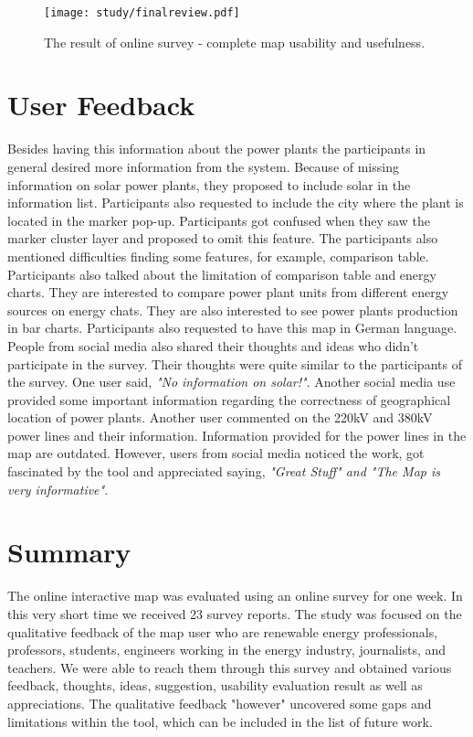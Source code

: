 \begin{figure} 
  \begin{center}
    \texttt{[image: study/finalreview.pdf]}
    \caption{The result of online survey - complete map usability and usefulness.}
    \label{fig:finalRev}
  \end{center}
\end{figure}

\section{User Feedback}

Besides having this information about the power plants the participants in general desired more information from the system. Because of missing information on solar power plants, they proposed to include solar in the information list. Participants also requested to include the city where the plant is located in the marker pop-up. Participants got confused when they saw the marker cluster layer and proposed to omit this feature. The participants also mentioned difficulties finding some features, for example, comparison table. Participants also talked about the limitation of comparison table and energy charts. They are interested to compare power plant units from different energy sources on energy chats. They are also interested to see power plants production in bar charts. Participants also requested to have this map in German language. People from social media also shared their thoughts and ideas who didn't participate in the survey. Their thoughts were quite similar to the participants of the survey. One user said, \textit{"No information on solar!"}. Another social media use provided some important information regarding the correctness of geographical location of power plants. Another user commented on the 220kV and 380kV power lines and their information. Information provided for the power lines in the map are outdated. However, users from social media noticed the work, got fascinated by the tool and appreciated saying, \textit{"Great Stuff" and "The Map is very informative"}.  

\section{Summary}

The online interactive map was evaluated using an online survey for one week. In this very short time we received 23 survey reports. The study was focused on the qualitative feedback of the map user who are renewable energy professionals, professors, students, engineers working in the energy industry, journalists, and teachers. We were able to reach them through this survey and obtained various feedback, thoughts, ideas, suggestion, usability evaluation result as well as appreciations. The qualitative feedback "however" uncovered some gaps and limitations within the tool, which can be included in the list of future work.
